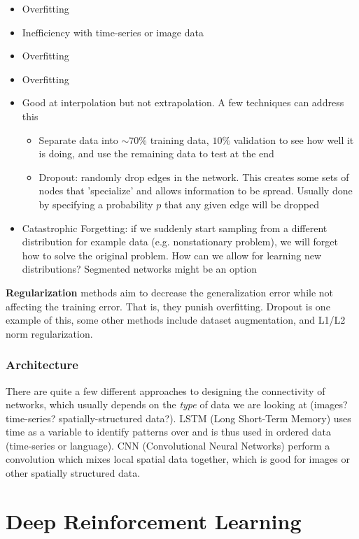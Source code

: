\documentclass[11pt]{report}
\begin{document}
\begin{itemize}
	\item Overfitting
	\item Inefficiency with time-series or image data
	\item Overfitting
	\item Overfitting
	\item Good at interpolation but not extrapolation. A few techniques can address this
	\begin{itemize}
		\item Separate data into $\sim70\%$ training data, $10\%$ validation to see how well it is doing, and use the remaining data to test at the end
		\item Dropout: randomly drop edges in the network. This creates some sets of nodes that 'specialize' and allows information to be spread. Usually done by specifying a probability $p$ that any given edge will be dropped
	\end{itemize}
	\item Catastrophic Forgetting: if we suddenly start sampling from a different distribution for example data (e.g. nonstationary problem), we will forget how to solve the original problem. How can we allow for learning new distributions? Segmented networks might be an option
\end{itemize}

\textbf{Regularization} methods aim to decrease the generalization error while not affecting the training error. That is, they punish overfitting. Dropout is one example of this, some other methods include dataset augmentation, and L1/L2 norm regularization.

\subsection{Architecture}
There are quite a few different approaches to designing the connectivity of networks, which usually depends on the \textit{type} of data we are looking at (images? time-series? spatially-structured data?). LSTM (Long Short-Term Memory) uses time as a variable to identify patterns over and is thus used in ordered data (time-series or language). CNN (Convolutional Neural Networks) perform a convolution which mixes local spatial data together, which is good for images or other spatially structured data.


\chapter{Deep Reinforcement Learning}
\end{document}
